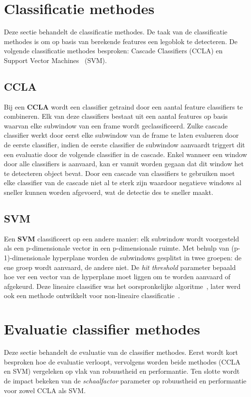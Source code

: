 \section{Classificatie methodes} \label{sec:class}
Deze sectie behandelt de classificatie methodes. De taak van de classificatie methodes is om op basis van berekende features een legoblok te detecteren. De volgende classificatie methodes besproken: Cascade Classifiers \cite{viola2001rapid} (CCLA) en Support Vector Machines~\cite{joachims1999svmlight} (SVM).

\subsection{CCLA} \label{sec:class_ccla}
Bij een \textbf{CCLA} wordt een classifier getraind door een aantal feature classifiers te combineren. Elk van deze classifiers bestaat uit een aantal features op basis waarvan elke subwindow van een frame wordt geclassificeerd. Zulke cascade classifier werkt door eerst elke subwindow van de frame te laten evalueren door de eerste classifier, indien de eerste classifier de subwindow aanvaardt triggert dit een evaluatie door de volgende classifier in de cascade. Enkel wanneer een window door alle classifiers is aanvaard, kan er vanuit worden gegaan dat dit window het te detecteren object bevat. Door een cascade van classifiers te gebruiken moet elke classifier van de cascade niet al te sterk zijn waardoor negatieve windows al sneller kunnen worden afgevoerd, wat de detectie des te sneller maakt.

\subsection{SVM} \label{sec:class_svm}
Een \textbf{SVM} classificeert op een andere manier: elk subwindow wordt voorgesteld als een p-dimensionale vector in een p-dimensionale ruimte. Met behulp van (p-1)-dimensionale hyperplane worden de subwindows gesplitst in twee groepen: de ene groep wordt aanvaard, de andere niet. De \textit{hit threshold} parameter bepaald hoe ver een vector van de hyperplane moet liggen om te worden aanvaard of afgekeurd. Deze lineaire classifier was het oorspronkelijke algoritme~\cite{vapnik1963pattern}, later werd ook een methode ontwikkelt voor non-lineaire classificatie~\cite{boser1992training}.

\section{Evaluatie classifier methodes} \label{sec:class_eval_res}
Deze sectie behandelt de evaluatie van de classifier methodes. Eerst wordt kort besproken hoe de evaluatie verloopt, vervolgens worden beide methodes (CCLA en SVM) vergeleken op vlak van robuustheid en performantie. Ten slotte wordt de impact bekeken van de \textit{schaalfactor} parameter op robuustheid en performantie voor zowel CCLA als SVM.

